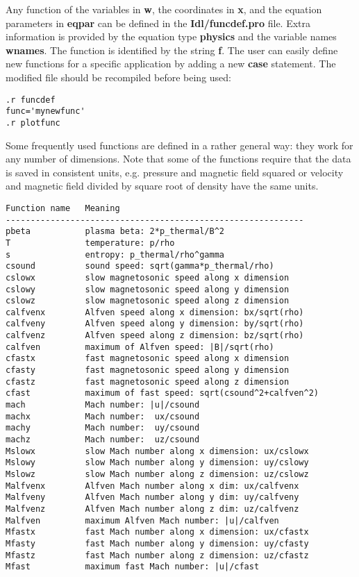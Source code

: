    Any function of the variables in {\bf w}, the coordinates in
   {\bf x}, and the equation parameters in {\bf eqpar} can be defined in the 
   {\bf Idl/funcdef.pro} file. Extra information is provided by the equation 
   type {\bf physics} and the variable names {\bf wnames}. The function is 
   identified by the string {\bf f}. The user can easily define new functions
   for a specific application by adding a new {\bf case} statement.
   The modified file should be recompiled before being used:
\begin{verbatim}
.r funcdef
func='mynewfunc'
.r plotfunc
\end{verbatim}
   Some frequently used functions are defined in a rather general way:
   they work for any number of dimensions. Note that some of the functions
   require that the data is saved in consistent units, e.g. 
   pressure and magnetic field squared or velocity and magnetic field
   divided by square root of density have the same units.
\begin{verbatim}
Function name   Meaning
------------------------------------------------------------
pbeta           plasma beta: 2*p_thermal/B^2
T               temperature: p/rho
s               entropy: p_thermal/rho^gamma
csound          sound speed: sqrt(gamma*p_thermal/rho)
cslowx          slow magnetosonic speed along x dimension
cslowy          slow magnetosonic speed along y dimension
cslowz          slow magnetosonic speed along z dimension
calfvenx        Alfven speed along x dimension: bx/sqrt(rho)
calfveny        Alfven speed along y dimension: by/sqrt(rho)
calfvenz        Alfven speed along z dimension: bz/sqrt(rho)
calfven         maximum of Alfven speed: |B|/sqrt(rho)
cfastx          fast magnetosonic speed along x dimension
cfasty          fast magnetosonic speed along y dimension
cfastz          fast magnetosonic speed along z dimension
cfast           maximum of fast speed: sqrt(csound^2+calfven^2)
mach            Mach number: |u|/csound
machx           Mach number:  ux/csound
machy           Mach number:  uy/csound
machz           Mach number:  uz/csound
Mslowx          slow Mach number along x dimension: ux/cslowx
Mslowy          slow Mach number along y dimension: uy/cslowy
Mslowz          slow Mach number along z dimension: uz/cslowz
Malfvenx        Alfven Mach number along x dim: ux/calfvenx
Malfveny        Alfven Mach number along y dim: uy/calfveny
Malfvenz        Alfven Mach number along z dim: uz/calfvenz
Malfven         maximum Alfven Mach number: |u|/calfven
Mfastx          fast Mach number along x dimension: ux/cfastx
Mfasty          fast Mach number along y dimension: uy/cfasty
Mfastz          fast Mach number along z dimension: uz/cfastz
Mfast           maximum fast Mach number: |u|/cfast
\end{verbatim}

